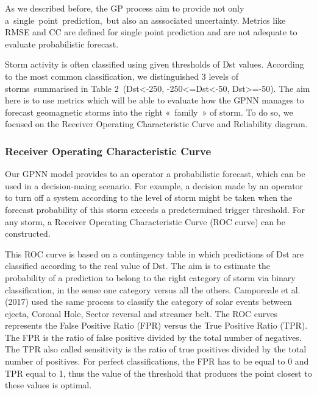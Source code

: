As we described before, the GP process aim to provide not only a\ single\ point\ prediction,\ 
but also an asssociated  uncertainty. Metrics like RMSE and CC are defined for single point prediction 
and  are not adequate  to evaluate  probabilistic forecast.


Storm activity is often classified using given thresholds of Dst values. According to the most common 
classification, we distinguished 3 levels of storms summarised in Table 2\ 
(Dst<-250, -250<=Dst<-50, Dst>=-50). The aim here is to use metrics which will be able to evaluate 
how the GPNN manages to forecast geomagnetic storms into the right « family » of storm. To do so, 
we focused on the Receiver Operating Characteristic Curve and Reliability diagram.



\subsubsection{Receiver Operating Characteristic Curve}


Our GPNN model provides to an operator a probabilistic forecast, which can be used in a decision-maing scenario. 
For example, a decision made by an operator to turn off a system according to the level of storm might be taken 
when the forecast probability of this storm exceeds a predetermined trigger threshold. For any storm, 
a Receiver Operating Characteristic Curve (ROC curve) can be constructed. 

This ROC curve is based on a contingency table in which predictions of Dst are classified according to the 
real value of Dst. The aim is to estimate the probability of a prediction to belong to the right category of storm 
via binary classification, in the sense one category versus all the others. Camporeale et al. (2017) used the 
same process to classify the category of solar events between ejecta, Coronal Hole, Sector reversal and streamer belt. 
The ROC curves represents the False Positive Ratio (FPR) versus the True Positive Ratio (TPR). The FPR is the ratio 
of false positive divided by the total number of negatives. The TPR also called sensitivity is the ratio of 
true positives divided by the total number of positives. For perfect classifications, the FPR has to be equal to 0 
and TPR equal to 1, thus the value of the threshold that produces the point closest to these values is optimal. 


